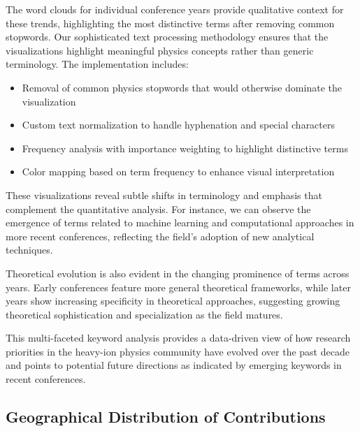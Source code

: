\documentclass[a4paper,11pt]{article}
\begin{document}
The word clouds for individual conference years provide qualitative context for these trends, highlighting the most distinctive terms after removing common stopwords. Our sophisticated text processing methodology ensures that the visualizations highlight meaningful physics concepts rather than generic terminology. The implementation includes:

\begin{itemize}
    \item Removal of common physics stopwords that would otherwise dominate the visualization
    \item Custom text normalization to handle hyphenation and special characters
    \item Frequency analysis with importance weighting to highlight distinctive terms
    \item Color mapping based on term frequency to enhance visual interpretation
\end{itemize}

These visualizations reveal subtle shifts in terminology and emphasis that complement the quantitative analysis. For instance, we can observe the emergence of terms related to machine learning and computational approaches in more recent conferences, reflecting the field's adoption of new analytical techniques.

Theoretical evolution is also evident in the changing prominence of terms across years. Early conferences feature more general theoretical frameworks, while later years show increasing specificity in theoretical approaches, suggesting growing theoretical sophistication and specialization as the field matures.

This multi-faceted keyword analysis provides a data-driven view of how research priorities in the heavy-ion physics community have evolved over the past decade and points to potential future directions as indicated by emerging keywords in recent conferences.

\subsection{Geographical Distribution of Contributions}
\end{document}
